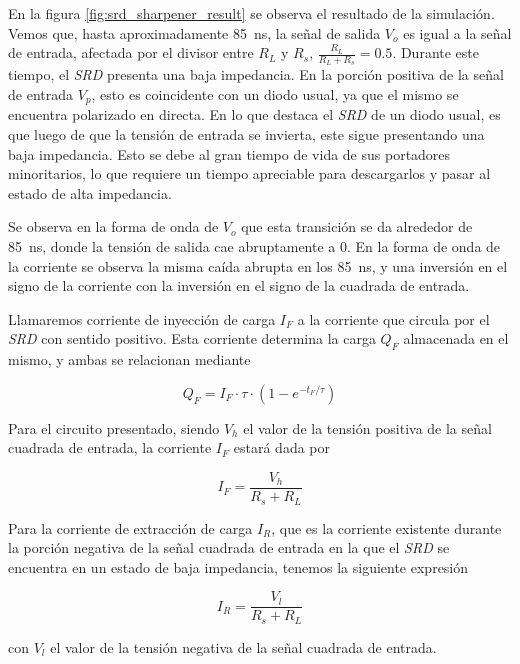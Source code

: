 En la figura \ref{fig:srd_sharpener_result} se observa el resultado de la
simulación. Vemos que, hasta aproximadamente \qty{85}{\nano\second}, la señal de
salida $V_o$ es igual a la señal de entrada, afectada por el divisor entre $R_L$
y $R_s$, $\frac{R_L}{R_L+R_s} = 0.5$. Durante este tiempo, el \textit{SRD} presenta
una baja impedancia. En la porción positiva de la señal de entrada $V_p$, esto
es coincidente con un diodo usual, ya que el mismo se encuentra polarizado en
directa. En lo que destaca el \textit{SRD} de un diodo usual, es que luego de que la
tensión de entrada se invierta, este sigue presentando una baja impedancia. Esto
se debe al gran tiempo de vida de sus portadores minoritarios, lo que requiere
un tiempo apreciable para descargarlos y pasar al estado de alta impedancia.

Se observa en la forma de onda de $V_o$ que esta transición se da alrededor de
\qty{85}{\nano\second}, donde la tensión de salida cae abruptamente a $0$. En la
forma de onda de la corriente se observa la misma caída abrupta en los
\qty{85}{\nano\second}, y una inversión en el signo de la corriente con la
inversión en el signo de la cuadrada de entrada.

Llamaremos corriente de inyección de carga $I_F$ a la corriente que circula por
el \textit{SRD} con sentido positivo. Esta corriente determina la carga
$Q_F$ almacenada en el mismo, y ambas se relacionan mediante \cite{an918}
\cite{moll1969}

\begin{equation}
    Q_F = I_F \cdot \tau \cdot \left( 1 - e^{-t_F/\tau}\right)
\end{equation}

Para el circuito presentado, siendo $V_h$ el valor de la tensión positiva de
la señal cuadrada de entrada, la corriente $I_F$ estará dada por

\begin{equation}
    I_{F} = \frac{V_h}{R_s+R_L}
\end{equation}

Para la corriente de extracción de carga $I_R$, que es la corriente existente
durante la porción negativa de la señal cuadrada de entrada en la que el
\textit{SRD} se encuentra en un estado de baja impedancia, tenemos la siguiente
expresión

\begin{equation}
    I_{R} = \frac{V_l}{R_s+R_L}
\end{equation}

con $V_l$ el valor de la tensión negativa de la señal cuadrada de entrada.

